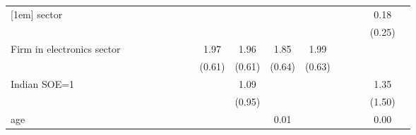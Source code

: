 \begin{table}[htbp]
\begin{tabular*}{0.8\hsize}{@{\hskip\tabcolsep\extracolsep\fill}l*{16}{c}}
[1em]
sector              &                     &                     &                     &                     &                     &                     &                     &                     &                     &                     &                     &                     &                     &                     &        0.18         &                     \\
                    &                     &                     &                     &                     &                     &                     &                     &                     &                     &                     &                     &                     &                     &                     &      (0.25)         &                     \\
[1em]
Firm in electronics sector&                     &                     &                     &                     &                     &                     &                     &        1.97\sym{***}&        1.96\sym{***}&        1.85\sym{***}&        1.99\sym{***}&                     &                     &                     &                     &                     \\
                    &                     &                     &                     &                     &                     &                     &                     &      (0.61)         &      (0.61)         &      (0.64)         &      (0.63)         &                     &                     &                     &                     &                     \\
[1em]
Indian SOE=1        &                     &                     &                     &                     &                     &                     &                     &                     &        1.09         &                     &                     &                     &                     &                     &        1.35         &                     \\
                    &                     &                     &                     &                     &                     &                     &                     &                     &      (0.95)         &                     &                     &                     &                     &                     &      (1.50)         &                     \\
[1em]
age                 &                     &                     &                     &                     &                     &                     &                     &                     &                     &        0.01         &                     &                     &                     &                     &        0.00         &                     \\

\end{tabular*}
\end{table}
